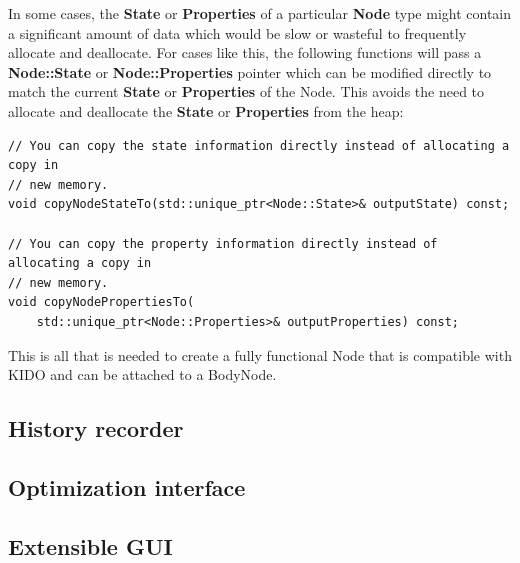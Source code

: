 In some cases, the \textbf{State} or \textbf{Properties} of a particular \textbf{Node} type might contain a significant amount of data which would be slow or wasteful to frequently allocate and deallocate. For cases like this, the following functions will pass a \textbf{Node::State} or \textbf{Node::Properties} pointer which can be modified directly to match the current \textbf{State} or \textbf{Properties} of the Node. This avoids the need to allocate and deallocate the \textbf{State} or \textbf{Properties} from the heap:

\begin{lstlisting}
// You can copy the state information directly instead of allocating a copy in
// new memory.
void copyNodeStateTo(std::unique_ptr<Node::State>& outputState) const;

// You can copy the property information directly instead of allocating a copy in
// new memory.
void copyNodePropertiesTo(
    std::unique_ptr<Node::Properties>& outputProperties) const;
\end{lstlisting}

This is all that is needed to create a fully functional Node that is compatible with KIDO and can be attached to a BodyNode.

\subsection{History recorder}
\subsection{Optimization interface}
\label{sec:optimizer}
\subsection{Extensible GUI}
